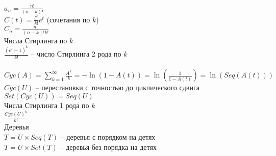 \documentclass[12pt]{article}
\begin{document}
$a_n = \frac{n!}{(n-k)!}$\\
$C(t) = \frac{t^k}{k!} e^t$ (сочетания по $k$)\\
$C_n = \frac{n!}{(n-k)!k!}$\\
Числа Стирлинга по $k$\\
$\frac{(e^t - 1)^k}{k!}$ -- число Стирлинга 2 рода по $k$\\\\
$Cyc(A) = \sum_{k=1}^{\infty} \frac{A^k}{k} = -\ln(1 - A(t)) = \ln(\frac{1}{1-A(t)}) = \ln(Seq(A(t)))$\\
$Cyc(U)$ -- перестановки с точностью до циклического сдвига\\
$Set(Cyc (U)) = Seq (U)$\\
Числа Стирлинга 1 рода по $k$\\
$\frac{Cyc(U)^k}{k!}$\\
Деревья\\
$T = U \times Seq(T)$ -- деревья с порядком на детях\\
$T = U \times Set(T)$ -- деревья без порядка на детях
\end{document}
